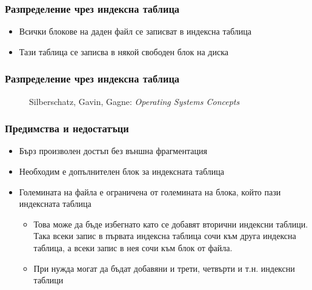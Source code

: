 \documentclass[ignorenonframetext, hyperref=unicode]{beamer}
\begin{document}
\begin{frame}
\frametitle{Разпределение чрез индексна таблица}
\begin{itemize}
  \item Всички блокове на даден файл се записват в индексна таблица
  \item Тази таблица се записва в някой свободен блок на диска
\end{itemize}
\end{frame}

\begin{frame}
\frametitle{Разпределение чрез индексна таблица}
\begin{figure}[h]
\center
{}
\caption{Silberschatz, Gavin, Gagne: {\em Operating Systems Concepts}}
\end{figure}
\end{frame}

\begin{frame}
\frametitle{Предимства и недостатъци}
\begin{itemize}
  \item Бърз произволен достъп без външна фрагментация
  \item Необходим е допълнителен блок за индексната таблица
  \item Големината на файла е ограничена от големината на блока, който пази индексната таблица
  \begin{itemize}
		\item Това може да бъде избегнато като се добавят вторични индексни таблици. Така всеки запис в първата индексна таблица сочи към друга индексна таблица, а всеки запис в нея сочи към блок от файла.
		\item При нужда могат да бъдат добавяни и трети, четвърти и т.н. индексни таблици
  \end{itemize}
\end{itemize}
\end{frame}
\end{document}
